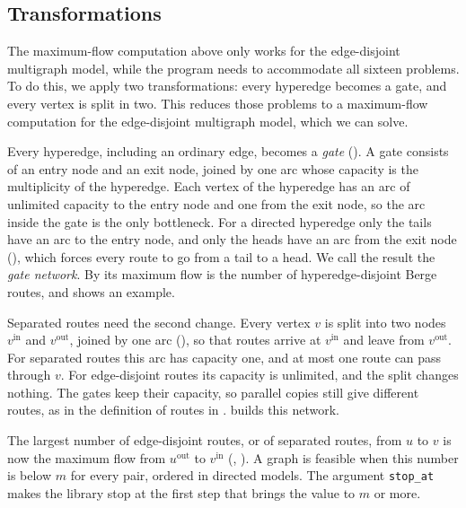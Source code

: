 \subsection{Transformations}\label{sec:transformations}
The maximum-flow computation above only works for the edge-disjoint multigraph model, while the program needs to accommodate all sixteen problems.
To do this, we apply two transformations: every hyperedge becomes a gate, and every vertex is split in two.
This reduces those problems to a maximum-flow computation for the edge-disjoint multigraph model, which we can solve.

Every hyperedge, including an ordinary edge, becomes a \emph{gate} ().
A gate consists of an entry node and an exit node, joined by one arc whose capacity is the multiplicity of the hyperedge.
Each vertex of the hyperedge has an arc of unlimited capacity to the entry node and one from the exit node, so the arc inside the gate is the only bottleneck.
For a directed hyperedge only the tails have an arc to the entry node, and only the heads have an arc from the exit node (), which forces every route to go from a tail to a head.
We call the result the \emph{gate network}.
By  its maximum flow is the number of hyperedge-disjoint Berge routes, and  shows an example.

Separated routes need the second change.
Every vertex $v$ is split into two nodes $v^{\mathrm{in}}$ and $v^{\mathrm{out}}$, joined by one arc (), so that routes arrive at $v^{\mathrm{in}}$ and leave from $v^{\mathrm{out}}$.
For separated routes this arc has capacity one, and at most one route can pass through $v$.
For edge-disjoint routes its capacity is unlimited, and the split changes nothing.
The gates keep their capacity, so parallel copies still give different routes, as in the definition of routes in .
 builds this network.


The largest number of edge-disjoint routes, or of separated routes, from $u$ to $v$ is now the maximum flow from $u^{\mathrm{out}}$ to $v^{\mathrm{in}}$ (, ).
A graph is feasible when this number is below $m$ for every pair, ordered in directed models.
The argument \texttt{stop\_at} makes the library stop at the first step that brings the value to $m$ or more.

